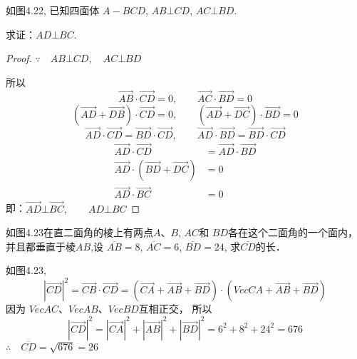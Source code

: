 \begin{example}
    如图4.22, 已知四面体
$A-BCD$, $AB\bot CD$, $AC\bot BD$.

求证：$AD\bot BC$.
\end{example}

\begin{proof}
    $\because\quad AB\bot CD,\quad AC\bot BD$

    所以
\[    \Vec{AB}\cdot \Vec{CD}=0,\qquad    \Vec{AC}\cdot \Vec{BD}=0\]
\[\left(\Vec{AD}+\Vec{DB}\right)\cdot \Vec{CD}=0,\qquad    \left(\Vec{AD}+\Vec{DC}\right)\cdot \Vec{BD}=0\]
\[\Vec{AD}\cdot \Vec{CD}=\Vec{BD}\cdot \Vec{CD},\qquad \Vec{AD}\cdot \Vec{BD}=\Vec{BD}\cdot \Vec{CD}\]
\[\begin{split}
    \Vec{AD}\cdot \Vec{CD}&=\Vec{AD}\cdot \Vec{BD}
    \\
    \Vec{AD}\cdot \left(\Vec{BD}+\Vec{DC}\right)&=0\\
    \Vec{AD}\cdot \Vec{BC}&=0
\end{split}\]
即：$\Vec{AD}\bot \Vec{BC},\qquad AD\bot BC$
\end{proof}


\begin{example}
    如图4.23在直二面角的棱上有两点$A$、$B$, $AC$和
    $BD$各在这个二面角的一个面内，并且都垂直于棱$AB$,设
    $\overline{AB}=8$, $\overline{AC}=6$, $\overline{BD}=24$, 求$\overline{CD}$的长．
\end{example}

\begin{solution}    
 如图4.23, 
\[|\Vec{CD}|^2=\Vec{CB}\cdot \Vec{CD}=\left(\Vec{CA}+\Vec{AB}+\Vec{BD}\right)\cdot \left(Vec{CA}+\Vec{AB}+\Vec{BD}\right)\]
因为
$Vec{AC}$、$Vec{AB}$、$Vec{BD}$互相正交，
所以
\[|\Vec{CD}|^2=|\Vec{CA}|^2+|\Vec{AB}|^2+|\Vec{BD}|^2=6^2+8^2+24^2=676\]
$\therefore\quad \overline{CD}=\sqrt{676}=26$
\end{solution}

